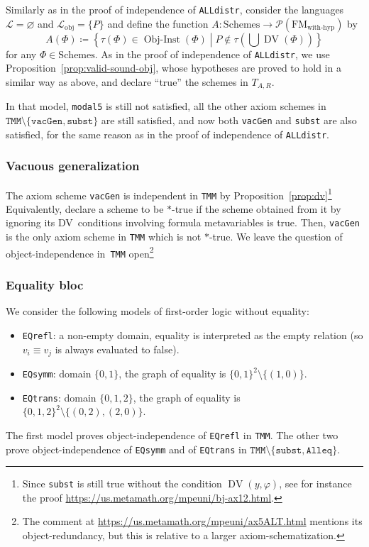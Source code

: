 \documentclass[11pt]{article}
\renewcommand*{\phi}{\varphi}
\newcommand*{\calL}{\mathcal{L}}
\newcommand*{\calP}{\mathcal{P}}
\newcommand*{\FM}{\mathrm{FM}}
\DeclareMathOperator{\DV}{DV}
\newcommand*{\Schemes}{\mathrm{Schemes}}
\newcommand*{\FMwithhyp}{{\FM_{\mathrm{with}\text{-}\mathrm{hyp}}}}
\theoremstyle{plain}
\theoremstyle{definition}
\theoremstyle{remark}
\begin{document}
Similarly as in the proof of independence of \texttt{ALLdistr}, consider the languages
$\calL = \varnothing$ and $\calL_\text{obj} = \{P \}$ and
define the function $A \colon \Schemes \to \calP(\FMwithhyp)$ by
\[
A(\Phi) \coloneqq \left\{ \tau(\Phi) \in \operatorname{Obj-Inst}(\Phi) \middle|
P \notin \tau(\bigcup \DV(\Phi))
\right\}
\]
for any $\Phi \in \Schemes$.
As in the proof of independence of \texttt{ALLdistr}, we use Proposition~\ref{prop:valid-sound-obj},
whose hypotheses are proved to hold in a similar way as above, and declare ``true'' the schemes
in $T_{A, R}$.


In that model, \texttt{modal5} is still not satisfied, all the other axiom schemes in
$\texttt{TMM} \setminus \{\texttt{vacGen}, \texttt{subst}\}$ are still satisfied, and now both
\texttt{vacGen} and \texttt{subst} are also satisfied, for the same reason as in the proof of
independence of \texttt{ALLdistr}.



\subsubsection{Vacuous generalization}

The axiom scheme \texttt{vacGen} is independent in \texttt{TMM} by
Proposition~\ref{prop:dv}\footnote{
Since \texttt{subst} is still true without the condition $\DV(y, \phi)$, see for instance the proof
\url{https://us.metamath.org/mpeuni/bj-ax12.html}.}
Equivalently, declare a scheme to be $*$-true if the scheme obtained from it by ignoring its
DV~conditions involving formula metavariables is true.
Then, \texttt{vacGen} is the only axiom scheme in \texttt{TMM} which is not $*$-true.
We leave the question of object-independence in~\texttt{TMM} open\footnote{The comment at
\url{https://us.metamath.org/mpeuni/ax5ALT.html} mentions its object-redundancy, but this is
relative to a larger axiom-schematization.}



\subsubsection{Equality bloc}

We consider the following models of first-order logic without equality:
\begin{itemize}
\item
\texttt{EQrefl}: a non-empty domain, equality is interpreted as the empty relation
(so $v_i \equiv v_j$ is always evaluated to false).
\item
\texttt{EQsymm}: domain $\{0, 1\}$, the graph of equality is $\{0, 1\}^2 \setminus \{(1, 0)\}$.
\item
\texttt{EQtrans}: domain $\{0, 1, 2\}$, the graph of equality is
$\{0, 1, 2\}^2 \setminus \{(0, 2), (2, 0)\}$.
\end{itemize}
The first model proves object-independence of \texttt{EQrefl} in \texttt{TMM}.
The other two prove object-independence  of \texttt{EQsymm} and of \texttt{EQtrans} in
$\texttt{TMM} \setminus \{ \texttt{subst}, \texttt{Alleq}\}$.
\end{document}
